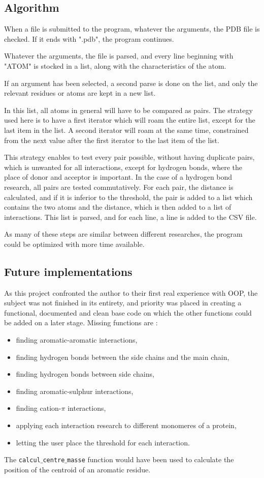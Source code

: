 \documentclass[]{article}
\begin{document}
\subsection{Algorithm}
When a file is submitted to the program, whatever the arguments, the PDB file is checked. If it ends with ".pdb", the program continues.

Whatever the arguments, the file is parsed, and every line beginning with "ATOM" is stocked in a list, along with the characteristics of the atom.

If an argument has been selected, a second parse is done on the list, and only the relevant residues or atoms are kept in a new list.

In this list, all atoms in general will have to be compared as pairs. The strategy used here is to have a first iterator which will roam the entire list, except for the last item in the list. A second iterator will roam at the same time, constrained from the next value after the first iterator to the last item of the list.

This strategy enables to test every pair possible, without having duplicate pairs, which is unwanted for all interactions, except for hydrogen bonds, where the place of donor and acceptor is important. In the case of a hydrogen bond research, all pairs are tested commutatively.
For each pair, the distance is calculated, and if it is inferior to the threshold, the pair is added to a list which contains the two atoms and the distance, which is then added to a list of interactions.
This list is parsed, and for each line, a line is added to the CSV file.

As many of these steps are similar between different researches, the program could be optimized with more time available. 
\subsection{Future implementations}
As this project confronted the author to their first real experience with OOP, the subject was not finished in its entirety, and priority was placed in creating a functional, documented and clean base code on which the other functions could be added on a later stage.
Missing functions are : 
\begin{itemize}
	\item finding aromatic-aromatic interactions,
	\item finding hydrogen bonds between the side chains and the main chain,
	\item finding hydrogen bonds between side chains,
	\item finding aromatic-sulphur interactions,
	\item finding cation-$\pi$ interactions,
	\item applying each interaction research to different monomeres of a protein,
	\item letting the user place the threshold for each interaction.
\end{itemize}
The \texttt{calcul$\_$centre$\_$masse} function would have been used to calculate the position of the centroid of an aromatic residue.
\end{document}
